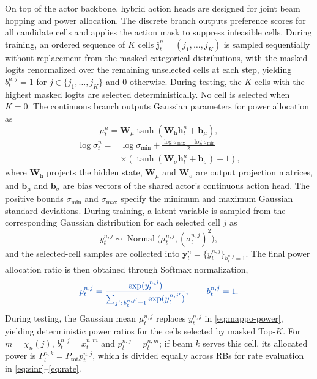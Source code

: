 \documentclass[journal]{IEEEtran}
\newcommand{\revbegin}[1]{\color{revisionblue}\ignorespaces}
\newcommand{\revend}[1]{\color{black}\ignorespaces}
\begin{document}
\revbegin{}On top of the actor backbone, hybrid action heads are designed for joint beam hopping and power allocation. The discrete branch outputs preference scores for all candidate cells and applies the action mask to suppress infeasible cells. During training, an ordered sequence of $K$ cells $\mathbf j_t^n=(j_1,\ldots,j_K)$ is sampled sequentially without replacement from the masked categorical distributions, with the masked logits renormalized over the remaining unselected cells at each step, yielding $b_t^{n,j}=1$ for $j\in\{j_1,\ldots,j_K\}$ and $0$ otherwise. During testing, the $K$ cells with the highest masked logits are selected deterministically. No cell is selected when $K=0$. The continuous branch outputs Gaussian parameters for power allocation as\revend{}
\begin{equation}
\mu_t^n=\mathbf W_{\mu}\tanh(\mathbf W_{\mathrm{h}}\mathbf h_t^n+\mathbf b_{\mu}),
\label{eq:mappo-mu}
\end{equation}
\begin{equation}
\begin{aligned}
\log\sigma_t^n={}&\log\sigma_{\min}+\frac{\log\sigma_{\max}-\log\sigma_{\min}}{2}\\
&\times\left(\tanh(\mathbf W_{\sigma}\mathbf h_t^n+\mathbf b_{\sigma})+1\right),
\end{aligned}
\label{eq:mappo-logsigma}
\end{equation}
\revbegin{}where $\mathbf W_{\mathrm{h}}$ projects the hidden state, $\mathbf W_{\mu}$ and $\mathbf W_{\sigma}$ are output projection matrices, and $\mathbf b_{\mu}$ and $\mathbf b_{\sigma}$ are bias vectors of the shared actor's continuous action head. The positive bounds $\sigma_{\min}$ and $\sigma_{\max}$ specify the minimum and maximum Gaussian standard deviations.
During training, a latent variable is sampled from the corresponding Gaussian distribution for each selected cell $j$ as\revend{}
\begin{equation}
y_t^{n,j}\sim\operatorname{Normal}\big(\mu_t^{n,j},(\sigma_t^{n,j})^2\big),
\end{equation}
\revbegin{}and the selected-cell samples are collected into $\mathbf y_t^n=\{y_t^{n,j}\}_{b_t^{n,j}=1}$. \revend{}The final power allocation ratio is then obtained through Softmax normalization,
\begin{equation}\color{revisionblue}
p_t^{n,j}=
\frac{\exp(y_t^{n,j})}
{\sum_{j':\,b_t^{n,j'}=1}\exp(y_t^{n,j'})},
\qquad b_t^{n,j}=1.
\label{eq:mappo-power}
\end{equation}
\revbegin{}During testing, the Gaussian mean $\mu_t^{n,j}$ replaces $y_t^{n,j}$ in \eqref{eq:mappo-power}, yielding deterministic power ratios for the cells selected by masked Top-$K$.
For $m=\chi_n(j)$, $b_t^{n,j}=x_t^{n,m}$ and $p_t^{n,j}=p_t^{n,m}$; if beam $k$ serves this cell, its allocated power is $P_t^{n,k}=P_{\mathrm{tot}}p_t^{n,j}$, which is divided equally across RBs for rate evaluation in \eqref{eq:sinr}--\eqref{eq:rate}.\revend{}
\end{document}
